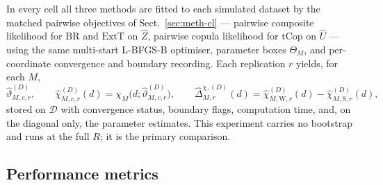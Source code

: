 In every cell all three methods are fitted to each simulated dataset by the matched pairwise objectives of Sect.~\ref{sec:meth-cl} --- pairwise composite likelihood for \(\mathrm{BR}\) and \(\mathrm{ExtT}\) on \(\widehat Z\), pairwise copula likelihood for \(\mathrm{tCop}\) on \(\widehat U\) --- using the same multi-start L-BFGS-B optimiser, parameter boxes \(\Theta_M\), and per-coordinate convergence and boundary recording. Each replication \(r\) yields, for each \(M\),
\begin{equation}
  \widehat\vartheta_{M,c,r}^{(D)},\qquad
  \widehat\chi_{M,c,r}^{(D)}(d)=\chi_M\!\bigl(d;\widehat\vartheta_{M,c,r}^{(D)}\bigr),\qquad
  \widehat\Delta_{M,r}^{\chi,(D)}(d)=\widehat\chi_{M,\mathrm W,r}^{(D)}(d)-\widehat\chi_{M,\mathrm S,r}^{(D)}(d),
\end{equation}
stored on \(\mathcal D\) with convergence status, boundary flags, computation time, and, on the diagonal only, the parameter estimates. This experiment carries no bootstrap and runs at the full \(R\); it is the primary comparison.

\subsection{Performance metrics}\label{sec:sim-metrics}

